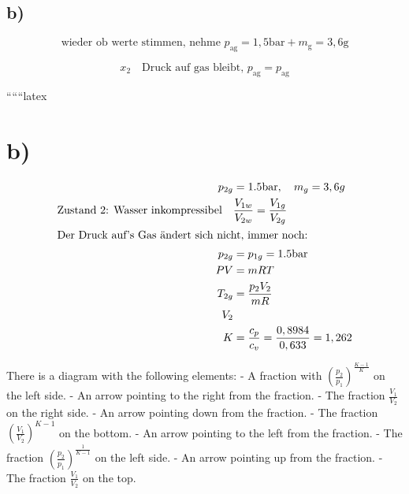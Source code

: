 

\subsection*{b)}

\[
\text{wieder ob werte stimmen, nehme } p_{\text{ag}} = 1,5 \text{bar} + m_{\text{g}} = 3,6 \text{g}
\]

\[
x_2 \quad \text{Druck auf gas bleibt, } p_{\text{ag}} = p_{\text{ag}}
\]

``````latex



\section*{b)}

\begin{align*}
    p_{2g} &= 1.5 \text{bar}, \quad m_g = 3,6g \\
    \text{Zustand 2: Wasser inkompressibel} \quad & \frac{V_{1w}}{V_{2w}} = \frac{V_{1g}}{V_{2g}} \\
    \intertext{Der Druck auf's Gas ändert sich nicht, immer noch:}
    p_{2g} &= p_{1g} = 1.5 \text{bar} \\
    PV &= mRT \\
    T_{2g} &= \frac{p_{2} V_{2}}{mR} \\
    V_{2} \\
    K &= \frac{c_p}{c_v} = \frac{0,8984}{0,633} = 1,262
\end{align*}

\noindent
There is a diagram with the following elements:
- A fraction with \(\left(\frac{p_2}{p_1}\right)^{\frac{K-1}{K}}\) on the left side.
- An arrow pointing to the right from the fraction.
- The fraction \(\frac{V_1}{V_2}\) on the right side.
- An arrow pointing down from the fraction.
- The fraction \(\left(\frac{V_1}{V_2}\right)^{K-1}\) on the bottom.
- An arrow pointing to the left from the fraction.
- The fraction \(\left(\frac{p_2}{p_1}\right)^{\frac{1}{K-1}}\) on the left side.
- An arrow pointing up from the fraction.
- The fraction \(\frac{V_1}{V_2}\) on the top.
